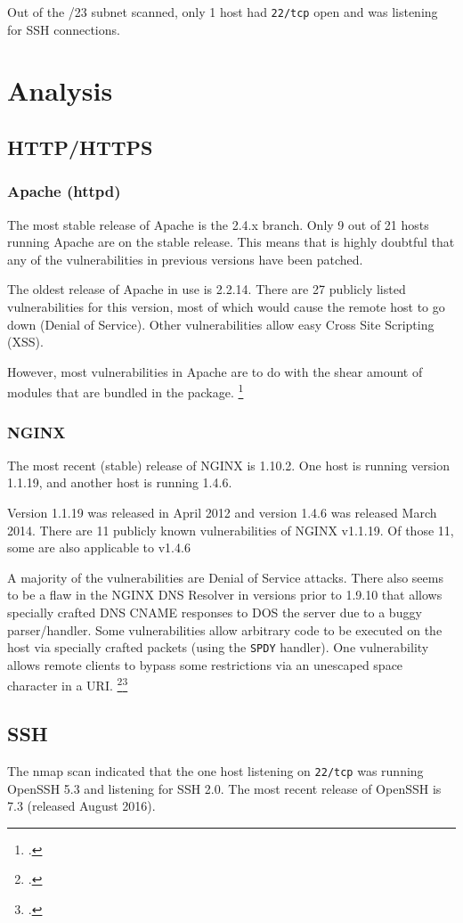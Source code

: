 \documentclass[a4paper]{article}
\begin{document}
Out of the /23 subnet scanned, only 1 host had \texttt{22/tcp} open and was listening for SSH connections.

\section{Analysis}
\subsection{HTTP/HTTPS}
\subsubsection{Apache (httpd)}
The most stable release of Apache is the 2.4.x branch.
Only 9 out of 21 hosts running Apache are on the stable release.
This means that is highly doubtful that any of the vulnerabilities in previous versions have been patched.

The oldest release of Apache in use is 2.2.14.
There are 27 publicly listed vulnerabilities for this version, most of which would cause the remote host to go down (Denial of Service).
Other vulnerabilities allow easy Cross Site Scripting (XSS).

However, most vulnerabilities in Apache are to do with the shear amount of modules that are bundled in the package.
\footcite{cve_apache}


\subsubsection{NGINX}
The most recent (stable) release of NGINX is 1.10.2.
One host is running version 1.1.19, and another host is running 1.4.6.

Version 1.1.19 was released in April 2012 and version 1.4.6 was released March 2014.
There are 11 publicly known vulnerabilities of NGINX v1.1.19.
Of those 11, some are also applicable to v1.4.6

A majority of the vulnerabilities are Denial of Service attacks.
There also seems to be a flaw in the NGINX DNS Resolver in versions prior to 1.9.10 that allows specially crafted DNS CNAME responses to DOS the server due to a buggy parser/handler.
Some vulnerabilities allow arbitrary code to be executed on the host via specially crafted packets (using the \texttt{SPDY} handler).
One vulnerability allows remote clients to bypass some restrictions via an unescaped space character in a URI.
\footcite{cve_nginx_1}\footcite{cve_nginx_2}

\subsection{SSH}
The nmap scan indicated that the one host listening on \texttt{22/tcp} was running OpenSSH 5.3 and listening for SSH 2.0.
The most recent release of OpenSSH is 7.3 (released August 2016).
\end{document}
